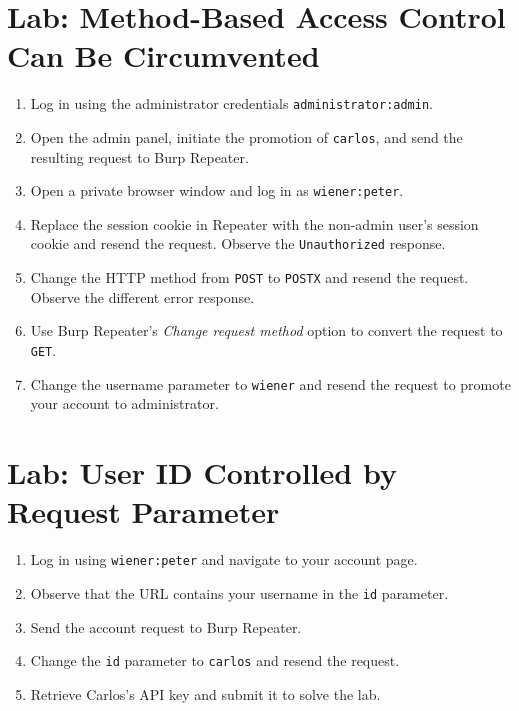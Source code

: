 \documentclass[11pt,a4paper]{article}
\begin{document}
\newpage
\section{Lab: Method-Based Access Control Can Be Circumvented}
\vspace{0.3cm}

\begin{enumerate}
    \item Log in using the administrator credentials \texttt{administrator:admin}.
    \item Open the admin panel, initiate the promotion of \texttt{carlos}, and send the resulting request to Burp Repeater.
    \item Open a private browser window and log in as \texttt{wiener:peter}.
    \item Replace the session cookie in Repeater with the non-admin user's session cookie and resend the request. Observe the \texttt{Unauthorized} response.
    \item Change the HTTP method from \texttt{POST} to \texttt{POSTX} and resend the request. Observe the different error response.
    \item Use Burp Repeater's \textit{Change request method} option to convert the request to \texttt{GET}.
    \item Change the username parameter to \texttt{wiener} and resend the request to promote your account to administrator.
\end{enumerate}

\section{Lab: User ID Controlled by Request Parameter}
\vspace{0.3cm}

\begin{enumerate}
    \item Log in using \texttt{wiener:peter} and navigate to your account page.
    \item Observe that the URL contains your username in the \texttt{id} parameter.
    \item Send the account request to Burp Repeater.
    \item Change the \texttt{id} parameter to \texttt{carlos} and resend the request.
    \item Retrieve Carlos's API key and submit it to solve the lab.
\end{enumerate}
\end{document}
